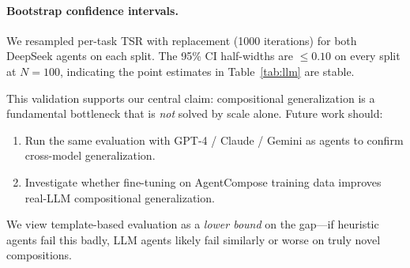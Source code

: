 \documentclass[10pt]{article}
\begin{document}
\paragraph{Bootstrap confidence intervals.} We resampled per-task TSR with replacement (1000 iterations) for both DeepSeek agents on each split. The 95\% CI half-widths are $\leq 0.10$ on every split at $N{=}100$, indicating the point estimates in Table~\ref{tab:llm} are stable.

This validation supports our central claim: compositional generalization is a fundamental bottleneck that is \emph{not} solved by scale alone. Future work should:
\begin{enumerate}
    \item Run the same evaluation with GPT-4 / Claude / Gemini as agents to confirm cross-model generalization.
    \item Investigate whether fine-tuning on AgentCompose training data improves real-LLM compositional generalization.
\end{enumerate}

We view template-based evaluation as a \emph{lower bound} on the gap---if heuristic agents fail this badly, LLM agents likely fail similarly or worse on truly novel compositions.
\end{document}
